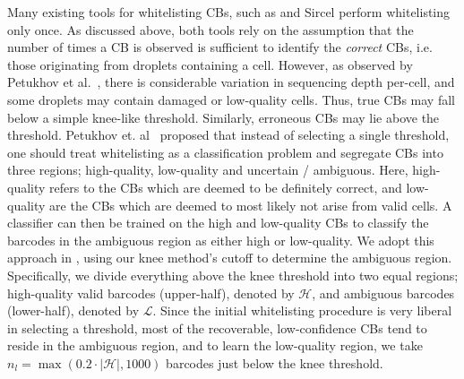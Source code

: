 Many existing tools for whitelisting CBs, such as \cellr \citep{tenx} and Sircel\citep{sircel} perform whitelisting only once. As discussed above, both tools rely on the assumption that the number of times a CB is observed is sufficient to identify the \emph{correct} CBs, i.e. those originating from droplets containing a cell. However, as observed by Petukhov et al.~\citep{dropest}, there is considerable variation in sequencing depth per-cell, and some droplets may contain damaged or low-quality cells. Thus, true CBs may fall below a simple knee-like threshold. Similarly, erroneous CBs may lie above the threshold. Petukhov et. al~\citep{dropest} proposed that instead of selecting a single threshold, one should treat whitelisting as a classification problem and segregate CBs into three regions; high-quality, low-quality and uncertain / ambiguous. Here, high-quality refers to the CBs which are deemed to be definitely correct, and low-quality are the CBs which are deemed to most likely not arise from valid cells. A classifier can then be trained on the high and low-quality CBs to classify the barcodes in the ambiguous region as either high or low-quality. We adopt this approach in \alevin, using our knee method's cutoff to determine the ambiguous region. Specifically, we divide everything above the knee threshold into two equal regions; high-quality valid barcodes (upper-half), denoted by $\mathcal{H}$, and ambiguous barcodes (lower-half), denoted by $\mathcal{L}$. Since the initial whitelisting procedure is very liberal in selecting a threshold, most of the recoverable, low-confidence CBs tend to reside in the ambiguous region, and to learn the low-quality region, we take $n_l = \max( 0.2 \cdot \left|\mathcal{H}\right|, 1000)$ barcodes just below the knee threshold.


